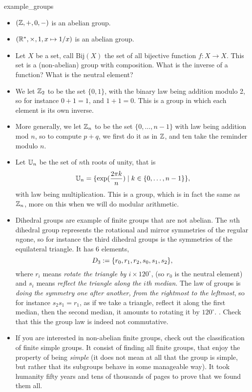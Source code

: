 \begin{cexp}{}{example_groups}
    \begin{itemize}
        \item \( (\mathbb{Z}, +, 0, -) \) is an abelian group.
        \item \( (\mathbb{R}^*, \times, 1, x \mapsto 1/x) \) is an abelian group.
        \item Let \( X \) be a set, call \( \mathrm{Bij}(X) \) the set of all bijective function \( f : X \to X \). This set is a (non-abelian) group with composition. What is the inverse of a function? What is the neutral element? 
        \item We let \( \mathbb{Z}_2 \) to be the set \( \{ 0, 1 \} \), with the binary law being addition modulo 2, so for instance \( 0 + 1 = 1 \), and \( 1 + 1 = 0 \). This is a group in which each element is its own inverse. 
        \item More generally, we let \( \mathbb{Z}_n \) to be the set \( \{ 0, \dots, n-1 \} \) with law being addition mod \( n \), so to compute \( p + q \), we first do it as in \( \mathbb{Z} \), and ten take the reminder modulo \( n \).
        \item Let \( \mathbb{U}_n \) be the set of \( n \)th roots of unity, that is
        \begin{equation*}
            \mathbb{U}_n = \{ \exp(\frac{2\pi k}{n}) \mid k \in \{0, \dots, n - 1\} \},
        \end{equation*}
        with law being multiplication. This is a group, which is in fact the same as \( \mathbb{Z}_n \), more on this when we will do modular arithmetic.
        \item Dihedral groups are example of finite groups that are not abelian. The \( n \)th dihedral group represents the rotational and mirror symmetries of the regular \( n \)gone, so for instance the third dihedral groups is the symmetries of the equilateral triangle. It has \( 6 \) elements, 
        \begin{equation*}
            D_3 := \{ r_0, r_1, r_2, s_0, s_1, s_2 \},    
        \end{equation*}
        where \( r_i \) means \textit{rotate the triangle by \( i \times 120^\circ \)}, (so \( r_0 \) is the neutral element) and \( s_i \) means \textit{reflect the triangle along the \( i \)th median}. The law of groups is \textit{doing the symmetry one after another, from the rightmost to the leftmost}, so for instance \( s_2s_1 = r_1 \), as if we take a triangle, reflect it along the first median, then the second median, it amounts to rotating it by \( 120^\circ \). . Check that this the group law is indeed not commutative.
        \item If you are interested in non-abelian finite groups, check out the classification of finite simple groups. It consist of finding all finite groups, that enjoy the property of being \textit{simple} (it does not mean at all that the group is simple, but rather that its subgroups behave in some manageable way). It took humanity fifty years and tens of thousands of pages to prove that we found them all.  
    \end{itemize}    
\end{cexp}

